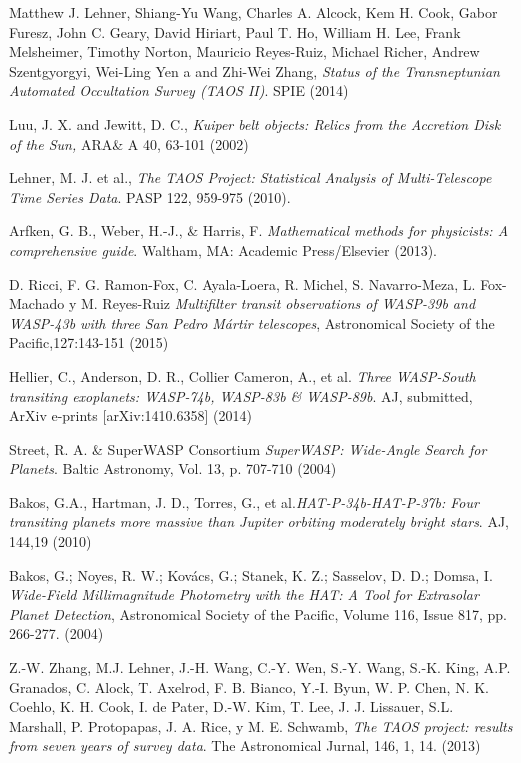 \renewcommand\bibname{\textbf{Referencias}}
\begin{thebibliography}{99}


 Matthew J. Lehner, Shiang-Yu Wang, Charles A. Alcock, Kem H. Cook, Gabor Furesz, John C. Geary, David Hiriart, Paul T. Ho, William H. Lee, Frank Melsheimer, Timothy Norton, Mauricio Reyes-Ruiz, Michael Richer, Andrew Szentgyorgyi, Wei-Ling Yen a and Zhi-Wei Zhang,  \textit{Status of the Transneptunian Automated Occultation Survey (TAOS II)}. SPIE (2014)

 Luu, J. X. and Jewitt, D. C., \textit{Kuiper belt objects: Relics from the Accretion Disk of the Sun,} ARA\& A 40, 63-101 (2002)

 Lehner, M. J. et al.,  \textit{The TAOS Project: Statistical Analysis of Multi-Telescope Time Series Data}. PASP 122, 959-975 (2010).

 Arfken, G. B., Weber, H.-J., \& Harris, F. \textit{Mathematical methods for physicists: A comprehensive guide}. Waltham, MA: Academic Press/Elsevier (2013).

 D. Ricci, F. G. Ramon-Fox, C. Ayala-Loera, R. Michel, S. Navarro-Meza, L. Fox-Machado y M. Reyes-Ruiz \textit{Multifilter transit observations of WASP-39b and WASP-43b with three San Pedro Mártir telescopes}, Astronomical Society of the Pacific,127:143-151 (2015)

 Hellier, C., Anderson, D. R., Collier Cameron, A., et al. \textit{Three WASP-South transiting exoplanets: WASP-74b, WASP-83b \& WASP-89b}. AJ, submitted, ArXiv e-prints [arXiv:1410.6358] (2014)

 Street, R. A. \& SuperWASP Consortium \textit{SuperWASP: Wide-Angle Search for Planets}. Baltic Astronomy, Vol. 13, p. 707-710 (2004)

 Bakos, G.A., Hartman, J. D., Torres, G., et al.\textit{HAT-P-34b-HAT-P-37b: Four transiting planets more massive than Jupiter orbiting moderately bright stars}. AJ, 144,19 (2010)

 Bakos, G.; Noyes, R. W.; Kovács, G.; Stanek, K. Z.; Sasselov, D. D.; Domsa, I. \textit{Wide-Field Millimagnitude Photometry with the HAT: A Tool for Extrasolar Planet Detection}, Astronomical Society of the Pacific, Volume 116, Issue 817, pp. 266-277. (2004)

 Z.-W. Zhang, M.J. Lehner, J.-H. Wang, C.-Y. Wen, S.-Y. Wang, S.-K. King, A.P. Granados, C. Alock, T. Axelrod, F. B. Bianco, Y.-I. Byun, W. P. Chen, N. K. Coehlo, K. H. Cook, I. de Pater, D.-W. Kim, T. Lee, J. J. Lissauer, S.L. Marshall, P. Protopapas, J. A. Rice, y M. E. Schwamb,  \textit{The TAOS project: results from seven years
of survey data}. The Astronomical Jurnal, 146, 1, 14. (2013)



\end{thebibliography}
